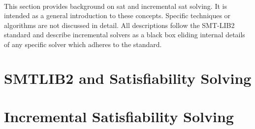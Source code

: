 ~\label{chapter:background}

This section provides background on \ac{sat} and incremental \ac{sat} solving.
It is intended as a general introduction to these concepts. Specific techniques
or algorithms are not discussed in detail. All descriptions follow the
SMT-LIB2~\cite{BarFT-SMTLIB} standard and describe incremental solvers as a
black box eliding internal details of any specific solver which adheres to the
standard.

\section{SMTLIB2 and Satisfiability Solving}


\section{Incremental Satisfiability Solving}


